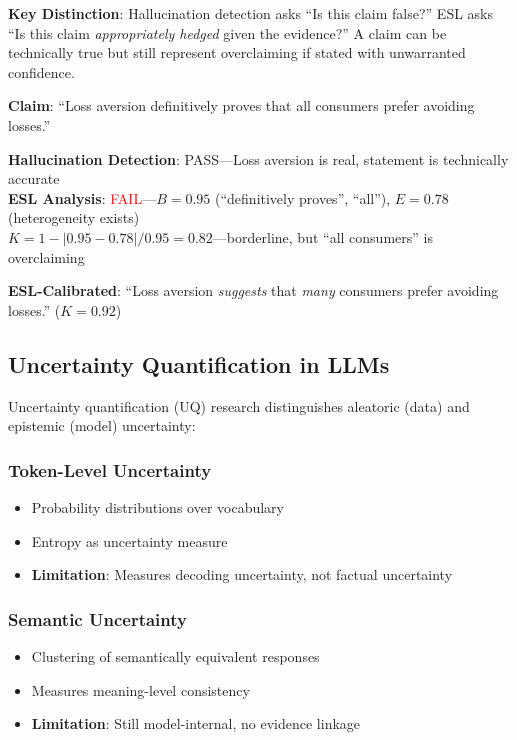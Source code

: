 \documentclass[11pt,a4paper]{article}
\begin{document}
\textbf{Key Distinction}: Hallucination detection asks ``Is this claim false?'' ESL asks ``Is this claim \textit{appropriately hedged} given the evidence?'' A claim can be technically true but still represent overclaiming if stated with unwarranted confidence.

\begin{practicalbox}[title={Example: Hallucination vs. Overclaiming}]
\textbf{Claim}: ``Loss aversion definitively proves that all consumers prefer avoiding losses.''

\textbf{Hallucination Detection}: \textcolor{green!60!black}{PASS}---Loss aversion is real, statement is technically accurate \\
\textbf{ESL Analysis}: \textcolor{red}{FAIL}---$B = 0.95$ (``definitively proves'', ``all''), $E = 0.78$ (heterogeneity exists) \\
$K = 1 - |0.95 - 0.78| / 0.95 = 0.82$---borderline, but ``all consumers'' is overclaiming

\textbf{ESL-Calibrated}: ``Loss aversion \textit{suggests} that \textit{many} consumers prefer avoiding losses.'' ($K = 0.92$)
\end{practicalbox}

\subsection{Uncertainty Quantification in LLMs}

Uncertainty quantification (UQ) research distinguishes aleatoric (data) and epistemic (model) uncertainty:

\subsubsection{Token-Level Uncertainty}

\begin{itemize}
    \item Probability distributions over vocabulary
    \item Entropy as uncertainty measure
    \item \textbf{Limitation}: Measures decoding uncertainty, not factual uncertainty
\end{itemize}

\subsubsection{Semantic Uncertainty}

\begin{itemize}
    \item Clustering of semantically equivalent responses
    \item Measures meaning-level consistency
    \item \textbf{Limitation}: Still model-internal, no evidence linkage
\end{itemize}
\end{document}
